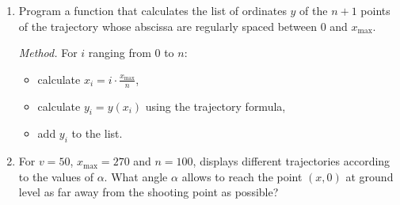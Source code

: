 \documentclass[11pt,class=report,crop=false]{standalone}
\begin{document}
\begin{activite}[Ballistics]
\begin{enumerate}
  \item Program a function  that calculates the list of ordinates $y$ of the $n+1$ points of the trajectory whose abscissa are regularly spaced between $0$ and $x_{\max}$. 
  
  \emph{Method.} For $i$ ranging from $0$ to $n$:
  \begin{itemize}
    \item calculate $x_i = i \cdot \frac{x_{\max}}{n}$,    
    \item calculate $y_i = y(x_i)$ using the trajectory formula,
    \item add $y_i$ to the list.
  \end{itemize}  
  
  
  \item For $v=50$, $x_{\max} = 270$ and $n=100$, displays different trajectories according to the values of $\alpha$. What angle $\alpha$ allows to reach the point $(x,0)$ at ground level as far away from the shooting point as possible?
  
  
\end{enumerate}

\end{activite}
\end{document}
